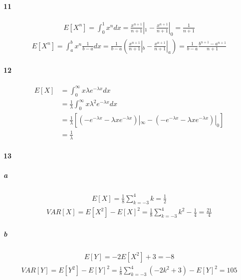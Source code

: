\documentclass[22pt]{article}
\begin{document}
	\paragraph{11}
	\begin{align}
	E[X^n] = \int_0^1 x^ndx = \frac{x^{n+1}}{n+1}|_1 - \frac{x^{n+1}}{n+1}|_0 = \frac{1}{n+1}
	\end{align}
	\begin{align}
	E[X^n] = \int_a^b x^n\frac{1}{b-a}dx = \frac{1}{b-a}(\frac{x^{n+1}}{n+1}|_b - \frac{x^{n+1}}{n+1}|_a) = \frac{1}{b-a}\frac{b^{n+1}-a^{n+1}}{n+1}
	\end{align}

	\paragraph{12}
	\begin{align}
	E[X] & = \int_0^\infty x \lambda	e^{-\lambda	x}dx\\
	& = \frac{1}{\lambda}\int_0^\infty x \lambda^2 e^{-\lambda	x}dx\\
	& = \frac{1}{\lambda}[(-e^{-\lambda	x}-\lambda	xe^{-\lambda x})|_\infty - (-e^{-\lambda	x}-\lambda	xe^{-\lambda x})|_0]\\
	& = \frac{1}{\lambda}
	\end{align}

	\paragraph{13}
		\subparagraph{a} \begin{align}E[X] = \frac{1}{8}\sum_{k=-3}^{4}k = \frac{1}{2}
		\end{align}
		\begin{align}
		VAR[X] = E[X^2]-E[X]^2 = \frac{1}{8}\sum_{k=-3}^{4}k^2 - \frac{1}{4} = \frac{21}{4}
		\end{align}
		\subparagraph{b} \begin{align}E[Y] = -2E[X^2]+3 = -8
		\end{align}
		\begin{align}VAR[Y] = E[Y^2]-E[Y]^2 = \frac{1}{8}\sum_{k=-3}^{4}(-2k^2+3) -E[Y]^2 =  105
		\end{align}
\end{document}
